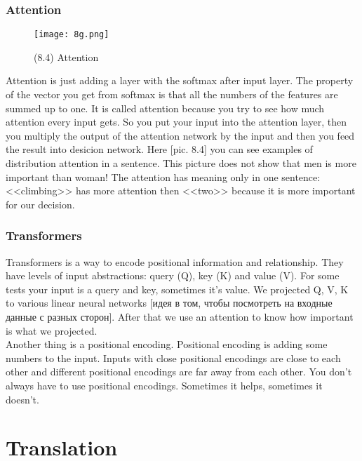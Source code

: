 \subsubsection*{Attention}

\begin{wrapfigure}{r}{0.35\linewidth}
  \vspace{-1cm}
  \begin{center}
    \texttt{[image: 8g.png]}
  \end{center}
  \vspace{-0.6cm}
  \caption*{(8.4) Attention}
  \vspace{-0.6cm}
\end{wrapfigure}
Attention is just adding a layer with the softmax after input layer. The property of the vector you get from softmax is that all the numbers of the features are summed up to one. It is called attention because you try to see how much attention every input gets. So you put your input into the attention layer, then you multiply the output of the attention network by the input and then you feed the result into desicion network. Here [pic. 8.4] you can see examples of distribution attention in a sentence. This picture does not show that men is more important than woman! The attention has meaning only in one sentence: <<climbing>> has more attention then <<two>> because it is more important for our decision. 

\subsubsection*{Transformers}

Transformers is a way to encode positional information and relationship. They have levels of input abstractions: query (Q), key (K) and value (V). For some tests your input is a query and key, sometimes it's value. We projected Q, V, K to various linear neural networks [идея в том, чтобы посмотреть на входные данные с разных сторон]. After that we use an attention to know how important is what we projected.\\
Another thing is a positional encoding. Positional encoding is adding some numbers to the input. Inputs with close positional encodings are close to each other and different positional encodings are far away from each other. You don't always have to use positional encodings. Sometimes it helps, sometimes it doesn't.

\section{Translation}
\vspace{-0.6cm}
